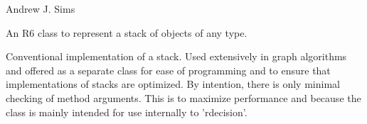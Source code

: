 \documentclass[a4paper]{book}
\begin{document}
%
\begin{Author}\relax
Andrew J. Sims 
\end{Author}
%
\begin{Description}\relax
An R6 class to represent a stack of objects of any type.
\end{Description}
%
\begin{Details}\relax
Conventional implementation of a stack. Used extensively in graph algorithms
and offered as a separate class for ease of programming and to ensure that
implementations of stacks are optimized. By intention, there is only minimal
checking of method arguments. This is to maximize performance and because the
class is mainly intended for use internally to 'rdecision'.
\end{Details}
%
\end{document}
